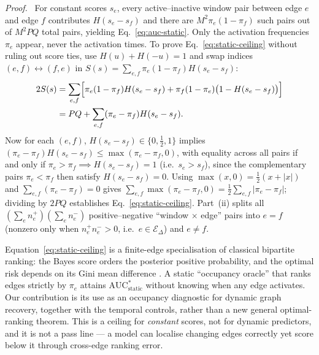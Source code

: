 \documentclass[11pt]{article}
\newenvironment{proof}[1][Proof]{\par\noindent\textit{#1.}\ }{\nobreak\hspace*{\fill}\begingroup\setlength{\fboxsep}{0pt}\fbox{\rule{0pt}{0.52em}\hspace{0.52em}}\endgroup\par\smallskip}
\begin{document}
\begin{proof}
For constant scores $s_e$, every active--inactive window pair between edge $e$
and edge $f$ contributes $H(s_e-s_f)$ and there are $M^2\pi_e(1-\pi_f)$ such
pairs out of $M^2 P Q$ total pairs, yielding Eq.~\eqref{eq:auc-static}. Only the
activation frequencies $\pi_e$ appear, never the activation times. To prove
Eq.~\eqref{eq:static-ceiling} without ruling out score ties, use $H(u)+H(-u)=1$
and swap indices $(e,f)\leftrightarrow(f,e)$ in $S(s)=\sum_{e,f}\pi_e(1-\pi_f)H(s_e-s_f)$:
\begin{align*}
2S(s)
&=\sum_{e,f}\Bigl[\pi_e(1-\pi_f)H(s_e-s_f)+\pi_f(1-\pi_e)\bigl(1-H(s_e-s_f)\bigr)\Bigr]\\
&=PQ+\sum_{e,f}(\pi_e-\pi_f)H(s_e-s_f).
\end{align*}
Now for each $(e,f)$, $H(s_e-s_f)\in\{0,\tfrac12,1\}$ implies
$(\pi_e-\pi_f)H(s_e-s_f)\le\max(\pi_e-\pi_f,0)$, with equality across all pairs if
and only if $\pi_e>\pi_f\implies H(s_e-s_f)=1$ (i.e.\ $s_e>s_f$), since the
complementary pairs $\pi_e<\pi_f$ then satisfy $H(s_e-s_f)=0$. Using
$\max(x,0)=\tfrac12(x+|x|)$ and $\sum_{e,f}(\pi_e-\pi_f)=0$ gives
$\sum_{e,f}\max(\pi_e-\pi_f,0)=\tfrac12\sum_{e,f}|\pi_e-\pi_f|$; dividing by
$2PQ$ establishes Eq.~\eqref{eq:static-ceiling}. Part~(ii) splits all
$(\sum_e n_e^+)(\sum_e n_e^-)$ positive--negative ``window $\times$ edge'' pairs
into $e=f$ (nonzero only when $n_e^+n_e^->0$, i.e.\ $e\in\mathcal E_\Delta$)
and $e\neq f$.
\end{proof}

Equation~\eqref{eq:static-ceiling} is a finite-edge specialisation
of classical bipartite ranking: the Bayes score orders the posterior positive
probability, and the optimal risk depends on its Gini mean difference
\citep[Example~1]{clemencon2008ranking}. A static ``occupancy oracle'' that
ranks edges strictly by $\pi_e$ attains $\mathrm{AUC}_{\mathrm{static}}^{*}$
without knowing when any edge activates. Our contribution is its use as an
occupancy diagnostic for dynamic graph recovery, together with the temporal
controls, rather than a new general optimal-ranking theorem. This is a ceiling
for \emph{constant} scores, not for dynamic predictors, and it is not a pass
line --- a model can localise changing edges correctly yet score below it
through cross-edge ranking error.
\end{document}
